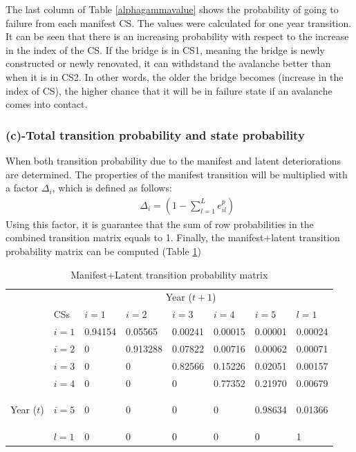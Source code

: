 \documentclass[fleqn]{article}
\begin{document}
The last column of Table \ref{alphagammavalue} shows the probability of going to failure from each manifest CS. The values were calculated for one year transition. It can be seen that there is an increasing probability with respect to the increase in the index of the CS. If the bridge is in CS1, meaning the bridge is newly constructed or newly renovated, it can withdstand the avalanche better than when it is in CS2. In other words, the older the bridge becomes (increase in the index of CS), the higher chance that it will be in failure state if an avalanche comes into contact.
%
\subsubsection*{(c)-Total transition probability and state probability}
When both transition probability due to the manifest and latent deteriorations are determined. The properties of the manifest transition will be multiplied with a factor $\Delta_i$, which is defined as follows:
\begin{eqnarray}
&& \Delta_i = (1-\sum_{l=1}^{L} e_{il}^p) \label{delta}
\end{eqnarray}
Using this factor, it is guarantee that the sum of row probabilities in the combined transition matrix equals to 1. Finally, the manifest+latent transition probability matrix can be computed (Table \ref{totalmatrix})

\begin{table}[H]
\caption{Manifest+Latent transition probability matrix}
\begin{center}
\begin{tabular}{l|l|lllll|l}
\hline
\multicolumn{1}{l}{} & \multicolumn{7}{c}{Year ($t+1$)} \\ 
\cline{2-8}
\multicolumn{1}{l}{} & CSs & $i=1$ & $i=2$ & $i=3$ & $i=4$ & $i=5$ & $l=1$ \\ 
\cline{2-8}
 & $i=1$ & 0.94154 & 0.05565 & 0.00241 & 0.00015 & 0.00001 & 0.00024 \\ 
 & $i=2$ & 0 & 0.913288 & 0.07822 & 0.00716 & 0.00062 & 0.00071 \\ 
 & $i=3$ & 0 & 0 & 0.82566 & 0.15226 & 0.02051 & 0.00157 \\ 
 & $i=4$ & 0 & 0 & 0 & 0.77352 & 0.21970 & 0.00679 \\ 
\begin{rotate}{90} Year ($t$) \end{rotate} & $i=5$ & 0 & 0 & 0 & 0 & 0.98634 & 0.01366 \\ 
\cline{2-8}
 & $l=1$ & 0 & 0 & 0 & 0 & 0 & 1 \\ 
\hline
\end{tabular}
\end{center}
\label{totalmatrix}
\end{table}
\end{document}
